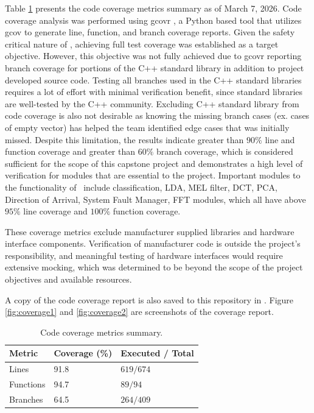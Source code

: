 \documentclass[12pt, titlepage]{article}
\begin{document}
{Table \ref{tab:code_coverage} presents the code coverage metrics summary as of
March 7, 2026. Code coverage analysis was performed using gcovr \cite{gcovr}, a
Python based tool that utilizes gcov to generate line, function, and branch
coverage reports. Given the safety critical nature of \progname, achieving full
test coverage was established as a target objective. However, this objective was
not fully achieved due to gcovr reporting branch coverage for portions of the
C++ standard library in addition to project developed source code. Testing all
branches used in the C++ standard libraries requires a lot of effort with
minimal verification benefit, since standard libraries are well-tested by the
C++ community. 
Excluding C++ standard library from code coverage is also not desirable as
knowing the missing branch cases (ex. cases of empty vector) has helped the team
identified edge cases that was initially missed.
Despite this limitation, the results indicate greater than $90\%$
line and function coverage and greater than $60\%$ branch coverage, which is
considered sufficient for the scope of this capstone project and demonstrates a
high level of verification for modules that are essential to the project.
Important modules to the functionality of \progname~include classification, LDA,
MEL filter, DCT, PCA, Direction of Arrival, System Fault Manager, FFT modules,
which all have above $95\%$ line coverage and $100\%$ function coverage.

These coverage metrics exclude manufacturer supplied libraries and hardware
interface components. Verification of manufacturer code is outside the project's
responsibility, and meaningful testing of hardware interfaces would require
extensive mocking, which was determined to be beyond the scope of the project
objectives and available resources.

A copy of the code coverage report is also saved to this repository in
\href{https://github.com/Team6-SixSense/audio360/blob/main/docs/VnVReport/coverage.html}{}.
Figure \ref{fig:coverage1} and \ref{fig:coverage2} are screenshots of the
coverage report.

\begin{table}[h]
  \centering
  \begin{tabular}{|l|l|l|} 
    \hline		
    \textbf{Metric} & \textbf{Coverage (\%)} & \textbf{Executed / Total} \\
    \hline 
    Lines & 91.8 & $619 / 674$\\ \hline
    Functions & 94.7 & $89 / 94$\\ \hline
    Branches & 64.5 & $264 / 409$\\ \hline
  \end{tabular}
  \caption{Code coverage metrics summary.}
  \label{tab:code_coverage}
\end{table}

}
\end{document}

